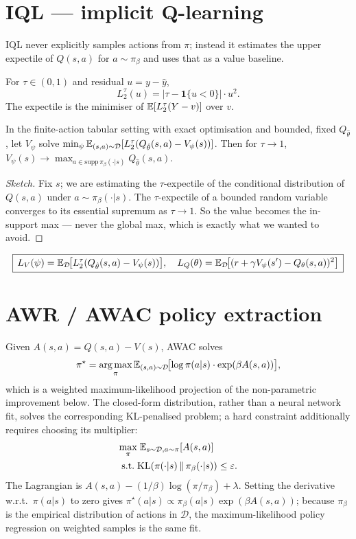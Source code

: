 \documentclass[11pt,oneside]{scrbook}
\begin{document}
\section{IQL --- implicit Q-learning}

IQL never explicitly samples actions from $\pi$; instead it estimates the upper
expectile of $Q(s,a)$ for $a \sim \pi_\beta$ and uses that as a value baseline.

\begin{definition}
For $\tau \in (0,1)$ and residual $u = y - \hat y$,
\[
  L_2^\tau(u) = |\tau - \mathbf{1}\{u < 0\}| \cdot u^2.
\]
The expectile is the minimiser of $\mathbb{E}[L_2^\tau(Y - v)]$ over $v$.
\end{definition}

\begin{theorem}
In the finite-action tabular setting with exact optimisation and bounded, fixed $Q_{\hat\theta}$, let $V_\psi$ solve $\min_\psi \mathbb{E}_{(s,a)\sim \mathcal{D}}[L_2^\tau(Q_{\hat\theta}(s,a) - V_\psi(s))]$.
Then for $\tau \to 1$, $V_\psi(s) \to \max_{a \in \mathrm{supp}\,\pi_\beta(\cdot|s)} Q_{\hat\theta}(s,a)$.
\end{theorem}

\begin{proof}[Sketch]
Fix $s$; we are estimating the $\tau$-expectile of the conditional distribution
of $Q(s,a)$ under $a \sim \pi_\beta(\cdot|s)$. The $\tau$-expectile of a bounded
random variable converges to its essential supremum as $\tau \to 1$. So the value
becomes the in-support max --- never the global max, which is exactly what we
wanted to avoid.
\end{proof}

\[
  \boxed{\,L_V(\psi) = \mathbb{E}_{\mathcal{D}}\!\bigl[L_2^\tau(Q_{\hat\theta}(s,a) - V_\psi(s))\bigr],\quad
         L_Q(\theta) = \mathbb{E}_{\mathcal{D}}\!\bigl[(r + \gamma V_\psi(s') - Q_\theta(s,a))^2\bigr]\,}
\]

\section{AWR / AWAC policy extraction}

Given $A(s,a) = Q(s,a) - V(s)$, AWAC solves
\[
  \pi^\star = \operatorname*{arg\,max}_\pi \mathbb{E}_{(s,a) \sim \mathcal{D}}\!\bigl[ \log \pi(a|s) \cdot \exp(\beta A(s,a))\bigr],
\]
which is a weighted maximum-likelihood projection of the non-parametric improvement below. The closed-form distribution, rather than a neural network fit, solves the corresponding KL-penalised problem; a hard constraint additionally requires choosing its multiplier:
\begin{align*}
  \max_\pi &\; \mathbb{E}_{s \sim \mathcal{D}, a \sim \pi}[A(s,a)] \\
  \text{s.t.}\; & \mathrm{KL}(\pi(\cdot|s) \,\|\, \pi_\beta(\cdot|s)) \le \varepsilon.
\end{align*}
The Lagrangian is $A(s,a) - (1/\beta) \log(\pi/\pi_\beta) + \lambda$. Setting the
derivative w.r.t.\ $\pi(a|s)$ to zero gives $\pi^\star(a|s) \propto \pi_\beta(a|s) \exp(\beta A(s,a))$;
because $\pi_\beta$ is the empirical distribution of actions in $\mathcal{D}$, the
maximum-likelihood policy regression on weighted samples is the same fit.
\end{document}
